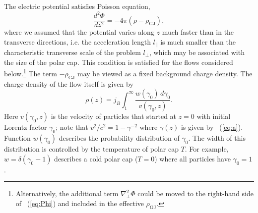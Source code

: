 The electric potential satisfies Poisson equation,
\begin{equation}
\label{eq:Phi}
    \frac{d^2\Phi}{dz^2}=-4\pi(\rho-\rho_\mathrm{GJ}),
\end{equation}
where we assumed that the potential varies along $z$ much faster than in
the transverse directions, i.e. the acceleration length $l_\parallel$ is much smaller
than the characteristic transverse scale of the problem $l_\perp$, which may be
associated with the size of the polar cap. This condition is satisfied for the flows considered below.\footnote{
      Alternatively, the additional term $\nabla_\perp^2\Phi$ could be moved to the
      right-hand side of \Eq~(\ref{eq:Phi}) and included in the effective $\rho_\mathrm{GJ}$.}
The term $-\rho_\mathrm{GJ}$ may be viewed as a fixed background charge density.
The charge density of the flow itself is given by
\begin{equation}
     \rho(z)=j_B \int_1^{\infty} \frac{w(\gamma_0)\,d\gamma_0}{v(\gamma_0,z)}.
\end{equation}
Here $v(\gamma_0,z)$ is the velocity of particles that started at $z=0$
with initial Lorentz factor $\gamma_0$; note that $v^2/c^2=1-\gamma^{-2}$ where
$\gamma(z)$ is given by \Eq~(\ref{eq:a}).
Function $w(\gamma_0)$ describes the probability distribution of $\gamma_0$.
The width of this distribution is controlled by the temperature of polar cap $T$.
For example, $w=\delta(\gamma_0-1)$ describes a cold polar cap ($T=0$) where
all particles have $\gamma_0=1$.

